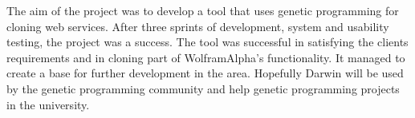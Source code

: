 The aim of the project was to develop a tool that uses genetic programming for cloning web services. After
three sprints of development, system and usability testing, the project was a success. The tool was successful
in satisfying the clients requirements and in cloning part of WolframAlpha's functionality. It managed to create a base
for further development in the area. Hopefully Darwin will be 
used by the genetic programming community and help genetic programming projects in the university.